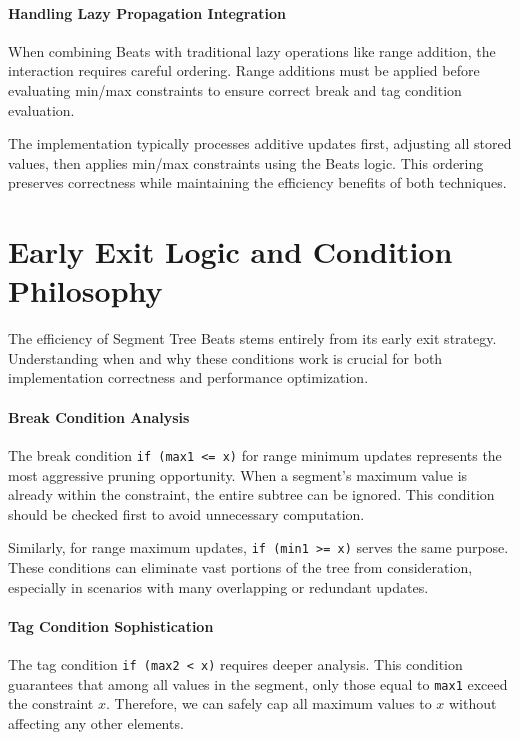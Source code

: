 \paragraph{Handling Lazy Propagation Integration}

When combining Beats with traditional lazy operations like range addition, the interaction requires careful ordering. Range additions must be applied before evaluating min/max constraints to ensure correct break and tag condition evaluation.

The implementation typically processes additive updates first, adjusting all stored values, then applies min/max constraints using the Beats logic. This ordering preserves correctness while maintaining the efficiency benefits of both techniques.

\section{Early Exit Logic and Condition Philosophy}
\label{sec:early_exit_logic}

The efficiency of Segment Tree Beats stems entirely from its early exit strategy. Understanding when and why these conditions work is crucial for both implementation correctness and performance optimization.

\paragraph{Break Condition Analysis}

The break condition \texttt{if (max1 <= x)} for range minimum updates represents the most aggressive pruning opportunity. When a segment's maximum value is already within the constraint, the entire subtree can be ignored. This condition should be checked first to avoid unnecessary computation.

Similarly, for range maximum updates, \texttt{if (min1 >= x)} serves the same purpose. These conditions can eliminate vast portions of the tree from consideration, especially in scenarios with many overlapping or redundant updates.

\paragraph{Tag Condition Sophistication}

The tag condition \texttt{if (max2 < x)} requires deeper analysis. This condition guarantees that among all values in the segment, only those equal to \texttt{max1} exceed the constraint $x$. Therefore, we can safely cap all maximum values to $x$ without affecting any other elements.

